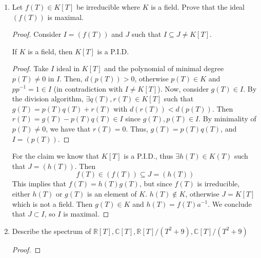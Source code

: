 \begin{problem}
    \begin{enumerate}[label=(\theproblem.\arabic*),ref=\theproblem.\arabic*]

        \item Let $f(T) \in K[T]$ be irreducible where $K$ is a field.
        Prove that the ideal $(f(T))$ is maximal.
            \begin{sol}
                \begin{proof}
                    Consider $I = (f(T))$ and $J$ such that $I \subseteq J \neq K[T]$.
                    \begin{claim} \label{itm:polynomial_field_is_pid}
                        If $K$ is a field, then $K[T]$ is a P.I.D.
                        \begin{proof}
                            Take $I$ ideal in $K[T]$ and the polynomial of minimal degree $p(T) \neq 0$ in $I$.
                            Then, $d(p(T)) > 0$, otherwise $p(T) \in K$ and $p p^{-1} = 1 \in I$ (in contradiction with $I \neq K[T]$).
                            Now, consider $g(T) \in I$.
                            By the division algorithm, $\exists q(T), r(T) \in K[T]$ such that $g(T) = p(T) q(T) + r(T)$ with $d(r(T)) < d(p(T))$.
                            Then $r(T) = g(T) - p(T) q(T) \in I$ since $g(T), p(T) \in I$.
                            By minimality of $p(T) \neq 0$, we have that $r(T) = 0$.
                            Thus, $g(T) = p(T) q(T)$, and $I = (p(T))$.
                        \end{proof}
                    \end{claim}
                    For the claim we know that $K[T]$ is a P.I.D., thus $\exists h(T) \in K(T)$ such that $J = (h(T))$.
                    Then
                    \[ f(T) \in (f(T)) \subseteq J = (h(T)) \]
                    This implies that $f(T) = h(T) g(T)$, but since $f(T)$ is irreducible, either $h(T)$ or $g(T)$ is an element of $K$.
                    $h(T) \notin K$, otherwise $J = K[T]$ which is not a field.
                    Then $g(T) \in K$ and $h(T) = f(T) a^{-1}$.
                    We conclude that $J \subset I$, so $I$ is maximal.
                \end{proof}
            \end{sol}
        \item Describe the spectrum of $\mathbb{R}[T], \mathbb{C}[T], \mathbb{R}[T]/(T^2+9), \mathbb{C}[T]/(T^2+9)$
            \begin{sol}
                \begin{proof}
                \end{proof}
            \end{sol}
    \end{enumerate}
\end{problem}